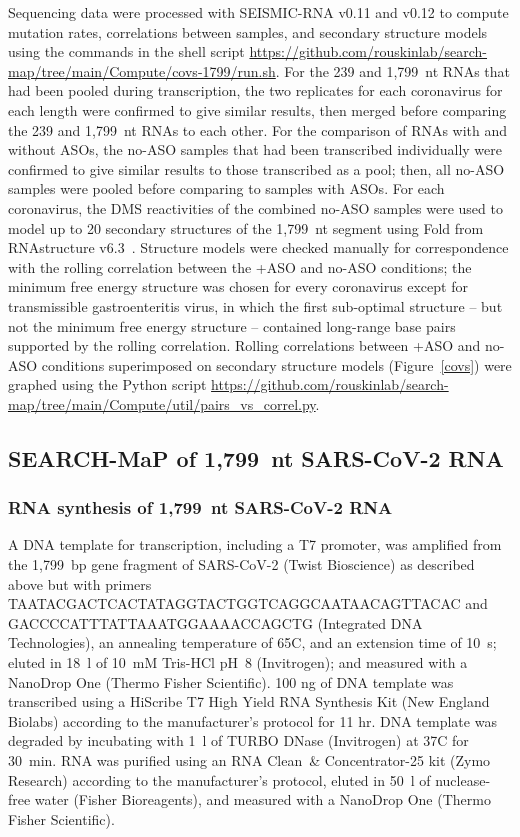 \documentclass[main.tex]{subfiles}
\begin{document}
Sequencing data were processed with SEISMIC-RNA v0.11 and v0.12 to compute mutation rates, correlations between samples, and secondary structure models using the commands in the shell script \url{https://github.com/rouskinlab/search-map/tree/main/Compute/covs-1799/run.sh}.
For the 239 and 1,799~nt RNAs that had been pooled during transcription, the two replicates for each coronavirus for each length were confirmed to give similar results, then merged before comparing the 239 and 1,799~nt RNAs to each other.
For the comparison of RNAs with and without ASOs, the no-ASO samples that had been transcribed individually were confirmed to give similar results to those transcribed as a pool; then, all no-ASO samples were pooled before comparing to samples with ASOs.
For each coronavirus, the DMS reactivities of the combined no-ASO samples were used to model up to 20 secondary structures of the 1,799~nt segment using Fold from RNAstructure v6.3~\cite{Reuter2010}.
Structure models were checked manually for correspondence with the rolling correlation between the +ASO and no-ASO conditions; the minimum free energy structure was chosen for every coronavirus except for transmissible gastroenteritis virus, in which the first sub-optimal structure -- but not the minimum free energy structure -- contained long-range base pairs supported by the rolling correlation.
Rolling correlations between +ASO and no-ASO conditions superimposed on secondary structure models (Figure~\ref{covs}) were graphed using the Python script \url{https://github.com/rouskinlab/search-map/tree/main/Compute/util/pairs_vs_correl.py}.


\subsection{SEARCH-MaP of 1,799~nt SARS-CoV-2 RNA}

\subsubsection{RNA synthesis of 1,799~nt SARS-CoV-2 RNA}

A DNA template for transcription, including a T7 promoter, was amplified from the 1,799~bp gene fragment of SARS-CoV-2 (Twist Bioscience) as described above but with primers TAATACGACTCACTATAGGTACTGGTCAGGCAATAACAGTTACAC and GACCCCATTTATTAAATGGAAAACCAGCTG (Integrated DNA Technologies), an annealing temperature of 65\textdegree C, and an extension time of 10~s; eluted in 18~\textmu l of 10~mM Tris-HCl pH~8 (Invitrogen); and measured with a NanoDrop One (Thermo Fisher Scientific).
100 ng of DNA template was transcribed using a HiScribe T7 High Yield RNA Synthesis Kit (New England Biolabs) according to the manufacturer's protocol for 11 hr.
DNA template was degraded by incubating with 1~\textmu l of TURBO DNase (Invitrogen) at 37\textdegree C for 30~min.
RNA was purified using an RNA Clean~\& Concentrator-25 kit (Zymo Research) according to the manufacturer's protocol, eluted in 50~\textmu l of nuclease-free water (Fisher Bioreagents), and measured with a NanoDrop One (Thermo Fisher Scientific).
\end{document}
